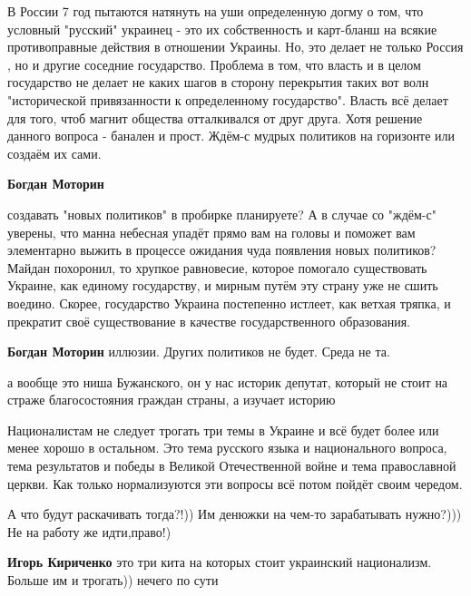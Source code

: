 \begin{itemize}

В России 7 год пытаются натянуть на уши определенную догму о том, что условный
"русский" украинец - это их собственность и карт-бланш на всякие противоправные
действия в отношении Украины. Но, это делает не только Россия , но и другие
соседние государство. Проблема в том, что власть и в целом государство не
делает не каких шагов в сторону перекрытия таких вот волн "исторической
привязанности к определенному государство". Власть всё делает для того, чтоб
магнит общества отталкивался от друг друга. Хотя решение данного вопроса -
банален и прост. Ждём-с мудрых политиков на горизонте или создаём их сами.

\begin{itemize} %
\textbf{Богдан Моторин} 

создавать "новых политиков" в пробирке планируете? А в случае со "ждём-с"
уверены, что манна небесная упадёт прямо вам на головы и поможет вам
элементарно выжить в процессе ожидания чуда появления новых политиков? Майдан
похоронил, то хрупкое равновесие, которое помогало существовать Украине, как
единому государству, и мирным путём эту страну уже не сшить воедино. Скорее,
государство Украина постепенно истлеет, как ветхая тряпка, и прекратит своё
существование в качестве государственного образования.


\textbf{Богдан Моторин} иллюзии. Других политиков не будет. Среда не та.
\end{itemize} %

а вообще это ниша Бужанского, он у нас историк депутат, который не стоит на страже благосостояния граждан страны, а изучает историю


Националистам не следует трогать три темы в Украине и всё будет более или менее
хорошо в остальном. Это тема русского языка и национального вопроса, тема
результатов и победы в Великой Отечественной войне и тема православной церкви.
Как только нормализуются эти вопросы всё потом пойдёт своим чередом.

\begin{itemize} %
А что будут раскачивать тогда?!)) Им денюжки на чем-то зарабатывать нужно?))) Не на работу же идти,право!)

\textbf{Игорь Кириченко} это три кита на которых стоит украинский национализм. Больше им и трогать)) нечего по сути


\end{itemize}
\end{itemize}
